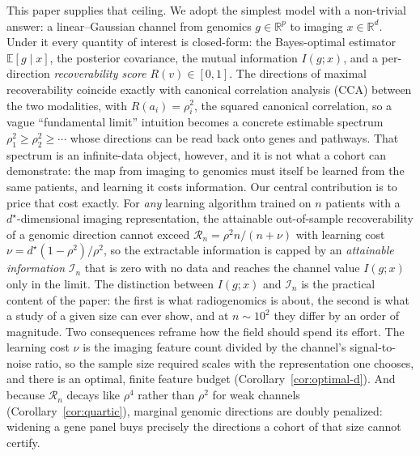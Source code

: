 \documentclass{article}
\newcommand{\R}{\mathbb{R}}
\newcommand{\E}{\mathbb{E}}
\begin{document}
This paper supplies that ceiling. We adopt the simplest model with a non-trivial
answer: a linear--Gaussian channel from genomics $g\in\R^p$ to imaging
$x\in\R^d$. Under it every quantity of interest is closed-form: the
Bayes-optimal estimator $\E[g\mid x]$, the posterior covariance, the mutual
information $I(g;x)$, and a per-direction \emph{recoverability score}
$R(v)\in[0,1]$. The directions of maximal recoverability coincide exactly with
canonical correlation analysis (CCA) between the two modalities, with
$R(a_i)=\rho_i^2$, the squared canonical correlation, so a vague ``fundamental
limit'' intuition becomes a concrete estimable spectrum
$\rho_1^2\ge\rho_2^2\ge\cdots$ whose directions can be read back onto genes and
pathways. That spectrum is an infinite-data object, however, and it is not what
a cohort can demonstrate: the map from imaging to genomics must itself be
learned from the same patients, and learning it costs information. Our central
contribution is to price that cost exactly. For \emph{any} learning algorithm
trained on $n$ patients with a $d^\star$-dimensional imaging representation, the
attainable out-of-sample recoverability of a genomic direction cannot exceed
$\mathcal{R}_n = \rho^2 n/(n+\nu)$ with learning cost
$\nu = d^\star(1-\rho^2)/\rho^2$, so the extractable information is capped by an
\emph{attainable information} $\mathcal{I}_n$ that is zero with no data and
reaches the channel value $I(g;x)$ only in the limit. The distinction between
$I(g;x)$ and $\mathcal{I}_n$ is the practical content of the paper: the first is
what radiogenomics is about, the second is what a study of a given size can ever
show, and at $n\sim 10^2$ they differ by an order of magnitude. Two consequences
reframe how the field should spend its effort. The learning cost $\nu$ is the
imaging feature count divided by the channel's signal-to-noise ratio, so the
sample size required scales with the representation one chooses, and there is an
optimal, finite feature budget (Corollary~\ref{cor:optimal-d}). And because
$\mathcal{R}_n$ decays like $\rho^4$ rather than $\rho^2$ for weak channels
(Corollary~\ref{cor:quartic}), marginal genomic directions are doubly penalized:
widening a gene panel buys precisely the directions a cohort of that size cannot
certify.
\end{document}
